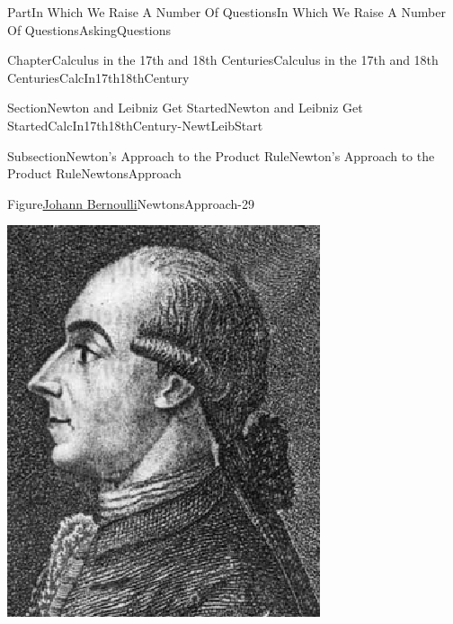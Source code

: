 \documentclass[oneside,10pt,]{book}
\numberwithin{equation}{part}
\begin{document}
\begin{partptx}{Part}{In Which We Raise A Number Of Questions}{}{In Which We Raise A Number Of Questions}{}{}{AskingQuestions}
\begin{chapterptx}{Chapter}{Calculus in the 17th and 18th Centuries}{}{Calculus in the 17th and 18th Centuries}{}{}{CalcIn17th18thCentury}
\begin{sectionptx}{Section}{Newton and Leibniz Get Started}{}{Newton and Leibniz Get Started}{}{}{CalcIn17th18thCentury-NewtLeibStart}
\begin{subsectionptx}{Subsection}{Newton's Approach to the Product Rule}{}{Newton's Approach to the Product Rule}{}{}{NewtonsApproach}
\begin{quote}
\end{quote}
\begin{figureptx}{Figure}{\href{https://mathshistory.st-andrews.ac.uk/Biographies/Bernoulli_Johann/}{Johann Bernoulli}\protect\footnotemark{}}{NewtonsApproach-29}{}%
%
\begin{image}{0.325}{0.35}{0.325}{}%
\includegraphics[width=\linewidth]{external/images/BernoulliJohann.png}
\end{image}%
\tcblower
\end{figureptx}%
%

\end{subsectionptx}
\end{sectionptx}
\end{chapterptx}
\end{partptx}
\end{document}
